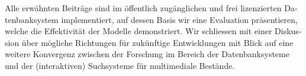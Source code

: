 \begin{otherlanguage}{ngerman}
Alle erwähnten Beiträge sind im öffentlich zugänglichen und frei lizenzierten Datenbanksystem \cottontail{} implementiert, auf dessen Basis wir eine Evaluation präsentieren, welche die Effektivität der Modelle demonstriert. Wir schliessen mit einer Diskussion über mögliche Richtungen für zukünftige Entwicklungen mit Blick auf eine weitere Konvergenz zwischen der Forschung im Bereich der Datenbanksysteme und der (interaktiven) Suchsysteme für multimediale Bestände.
\end{otherlanguage}

\cleardoublepage
